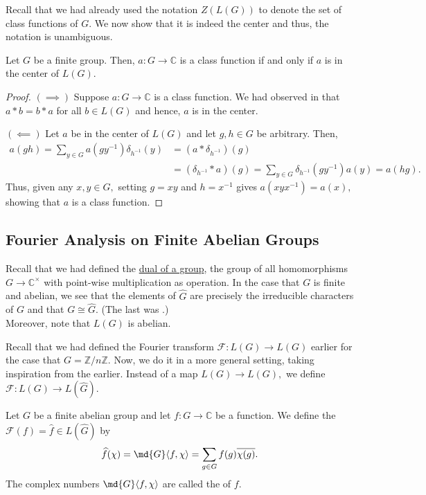 Recall that we had already used the notation $Z(L(G))$ to denote the set of class functions of $G.$ We now show that it is indeed the center and thus, the notation is unambiguous.

\begin{prop}
    Let $G$ be a finite group. Then, $a : G \to \mathbb{C}$ is a class function if and only if $a$ is in the center of $L(G).$
\end{prop}
\begin{proof}
    $(\implies)$ Suppose $a : G \to \mathbb{C}$ is a class function. We had observed in  that $a * b = b * a$ for all $b \in L(G)$ and hence, $a$ is in the center.
    
    $(\impliedby)$ Let $a$ be in the center of $L(G)$ and let $g, h \in G$ be arbitrary. Then,
    \begin{align*}
        a(gh) = \sum_{y \in G} a(gy^{-1})\delta_{h^{-1}}(y) &= (a * \delta_{h^{-1}})(g) \\
        &= (\delta_{h^{-1}} * a)(g) = \sum_{y \in G}\delta_{h^{-1}}(gy^{-1})a(y) = a(hg).
    \end{align*}
    Thus, given any $x, y \in G,$ setting $g = xy$ and $h = x^{-1}$ gives $a(xyx^{-1}) = a(x),$ showing that $a$ is a class function.
\end{proof}

\subsection{Fourier Analysis on Finite Abelian Groups}

Recall that we had defined the \hyperref[defn:dualgroup]{dual of a group}, the group of all homomorphisms $G \to \mathbb{C}^\times$ with point-wise multiplication as operation. In the case that $G$ is finite and abelian, we see that the elements of $\widehat{G}$ are precisely the irreducible characters of $G$ and that $G \cong \widehat{G}.$ (The last was .) \\
Moreover, note that $L(G)$ is abelian. 

Recall that we had defined the Fourier transform $\mathcal{F} : L(G) \to L(G)$ earlier for the case that $G = \mathbb{Z}/n\mathbb{Z}.$ Now, we do it in a more general setting, taking inspiration from the earlier. Instead of a map $L(G) \to L(G),$ we define $\mathcal{F} : L(G) \to L(\widehat{G}).$ 

\begin{defn}
    Let $G$ be a finite abelian group and let $f : G \to \mathbb{C}$ be a function. We define the  $\mathcal{F}(f) = \widehat{f} \in L(\widehat{G})$ by 
    \begin{equation*}
        \widehat{f}(\chi) = \md{G}\langle f, \chi\rangle = \sum_{g \in G}f(g) \overline{\chi(g)}.
    \end{equation*}
    The complex numbers $\md{G}\langle f, \chi\rangle$ are called the  of $f.$
\end{defn}

